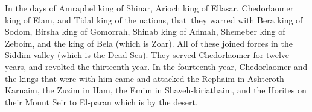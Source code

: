 
\begin{inparaenum}
     In the days of Amraphel king of Shinar, Arioch king of Ellasar, Chedorlaomer king of Elam, and Tidal king of the nations,%
     that\understood\ they warred with Bera king of Sodom, Birsha king of Gomorrah, Shinab king of Admah, Shemeber king of Zeboim, and the king of Bela (which is Zoar).%
     All of these joined forces in the Siddim valley (which is the Dead Sea).%
     They served Chedorlaomer for twelve years, and revolted the thirteenth year.%
     In the fourteenth year, Chedorlaomer and the kings that were with him came and attacked the Rephaim in Ashteroth Karnaim, the Zuzim in Ham, the Emim in Shaveh-kiriathaim,%
     and the Horites on their Mount Seir to El-paran which is by the desert.%
    
\end{inparaenum}

